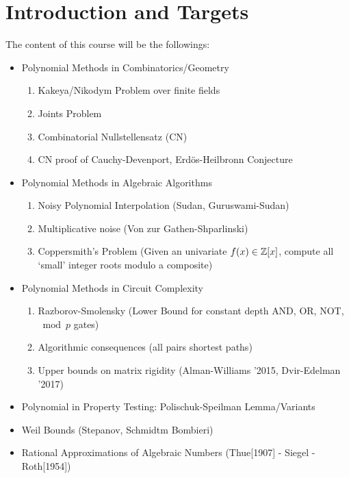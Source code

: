 \documentclass[twoside]{article}
\begin{document}
\section{Introduction and Targets}
The content of this course will be the followings:
\begin{itemize}[label=$\bullet$]
	\item Polynomial Methods in Combinatorics/Geometry
	\begin{enumerate}
		\item Kakeya/Nikodym Problem over finite fields
		\item Joints Problem
		\item Combinatorial Nullstellensatz (CN)
		\item CN proof of Cauchy-Devenport, Erd\"{o}s-Heilbronn Conjecture
	\end{enumerate}
	\item Polynomial Methods in Algebraic Algorithms
	\begin{enumerate}
		\item Noisy Polynomial Interpolation (Sudan, Guruswami-Sudan)
		\item Multiplicative noise (Von zur Gathen-Shparlinski)
		\item Coppersmith's Problem (Given an univariate $f(x)\in\mathbb{Z}[x]$, compute all `small' integer roots modulo a composite)
	\end{enumerate}
	\item Polynomial Methods in Circuit Complexity
	\begin{enumerate}
		\item Razborov-Smolensky (Lower Bound for constant depth \textsc{AND}, \textsc{OR}, \textsc{NOT}, $\bmod p$ gates)
		\item Algorithmic consequences (all pairs shortest paths)
		\item Upper bounds on matrix rigidity (Alman-Williams '2015, Dvir-Edelman '2017)
	\end{enumerate}
	\item Polynomial in Property Testing: Polischuk-Speilman Lemma/Variants
	\item Weil Bounds (Stepanov, Schmidtm Bombieri)
	\item Rational Approximations of Algebraic Numbers (Thue[1907] - Siegel - Roth[1954])
\end{itemize}
















\newpage



\end{document}
